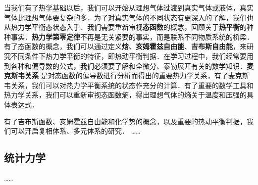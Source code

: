 当我们有了热学基础以后，我们可以开始从理想气体过渡到真实气体或液体，真实气体比理想气体要复杂的多．为了对真实气体的不同状态有更深入的了解，我们也从热力学平衡态状态入手．我们需要重新审视\textbf{态函数}的概念，回顾关于\textbf{热平衡}的种种事实．\textbf{热力学第零定律}不再是无关紧要的事实，而是联系不同物质系统的桥梁．有了态函数的概念，我们可以通过定义\textbf{焓}、\textbf{亥姆霍兹自由能}、\textbf{吉布斯自由能}，来研究不同条件下热力学平衡的特征，即热动平衡判据．在学习过程中，我们经常要用到各种和偏导数的公式，我们必须要了解和全微分、泰勒展开有关的数学知识．\textbf{麦克斯韦关系} 是对态函数的偏导数进行分析而得出的重要热力学关系，有了麦克斯韦关系，我们可以对热力学平衡系统的状态作充分的计算．有了重要的数学工具和热力学关系，我们可以重新审视态函数熵，得出理想气体的熵关于温度和压强的具体表达式．

有了吉布斯函数、亥姆霍兹自由能和化学势的概念，以及重要的热动平衡判据，我们可以开启复相体系、多元体系的研究．
……


\subsection{统计力学}
……
